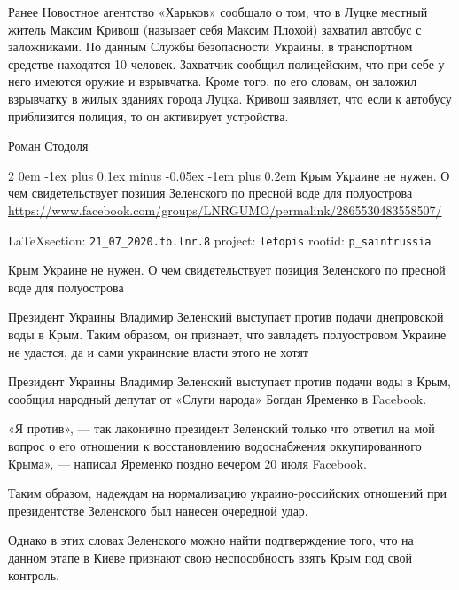 \documentclass[a4paper,11pt]{extreport}
\makeatletter
\renewcommand\subsection{%
  \clearpage
    \@startsection{subsection}%
    {2}%
    {0em}%
    {-1ex plus 0.1ex minus -0.05ex}%
    {-1em plus 0.2em}%
    {\scshape\bfseries\Large}%
}
\makeatother
\begin{document}
Ранее Новостное агентство «Харьков» сообщало о том, что в Луцке местный житель
Максим Кривош (называет себя Максим Плохой) захватил автобус с заложниками. По
данным Службы безопасности Украины, в транспортном средстве находятся 10
человек. Захватчик сообщил полицейским, что при себе у него имеются оружие и
взрывчатка. Кроме того, по его словам, он заложил взрывчатку в жилых зданиях
города Луцка. Кривош заявляет, что если к автобусу приблизится полиция, то он
активирует устройства. 

Роман Стодоля 
 
 
\subsection{Крым Украине не нужен. О чем свидетельствует позиция Зеленского по пресной воде для полуострова}
\label{sec:21_07_2020.fb.lnr.8}
\url{https://www.facebook.com/groups/LNRGUMO/permalink/2865530483558507/}
  
\vspace{0.5cm}
{\small\LaTeX section: \verb|21_07_2020.fb.lnr.8| project: \verb|letopis| rootid: \verb|p_saintrussia|}
\vspace{0.5cm}


Крым Украине не нужен. О чем свидетельствует позиция Зеленского по пресной воде для полуострова

Президент Украины Владимир Зеленский выступает против подачи днепровской воды в Крым. Таким образом, он признает, что завладеть полуостровом Украине не удастся, да и сами украинские власти этого не хотят

Президент Украины Владимир Зеленский выступает против подачи воды в Крым, сообщил народный депутат от «Слуги народа» Богдан Яременко в Facebook.

«Я против», --- так лаконично президент Зеленский только что ответил на мой вопрос о его отношении к восстановлению водоснабжения оккупированного Крыма», --- написал Яременко поздно вечером 20 июля Facebook.

Таким образом, надеждам на нормализацию украино-российских отношений при президентстве Зеленского был нанесен очередной удар.

Однако в этих словах Зеленского можно найти подтверждение того, что на данном этапе в Киеве признают свою неспособность взять Крым под свой контроль.
\end{document}
